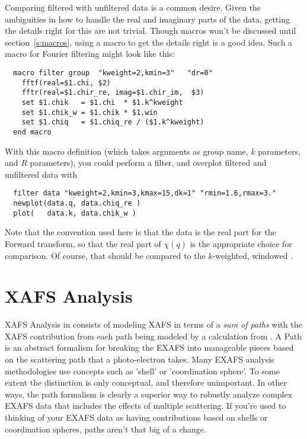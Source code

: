 \documentclass[11pt]{article}
\begin{document}
Comparing filtered with unfiltered data is a common desire. Given the
ambiguities in how to handle the real and imaginary parts of the data,
getting the details right for this are not trivial.  Though macros won't be
discussed until section~\ref{s:macros}, using a macro to get the details
right is a good idea.  Such a macro for Fourier filtering might look like
this:
{\small\begin{verbatim}
  macro filter group  "kweight=2,kmin=3"   "dr=0"
    fftf(real=$1.chi, $2)
    fftr(real=$1.chir_re, imag=$1.chir_im,  $3)
    set $1.chik   = $1.chi  * $1.k^kweight
    set $1.chik_w = $1.chik * $1.win
    set $1.chiq   = $1.chiq_re / ($1.k^kweight)
  end macro
\end{verbatim}}\noindent
With this macro definition (which takes arguments as group name, $k$
parameters, and $R$ parameters), you could perform a filter, and overplot
filtered and unfiltered data with
{\small\begin{verbatim}
  filter data "kweight=2,kmin=3,kmax=15,dk=1" "rmin=1.6,rmax=3."
  newplot(data.q, data.chiq_re )
  plot(   data.k, data.chik_w )
\end{verbatim}}\noindent
Note that the convention used here is that the data {\chik} is the real
part for the Forward transform, so that the real part of $\chi(q)$ is
the appropriate choice for comparison.  Of course, that should be
compared to the $k$-weighted, windowed {\chik}.


\clearpage
\section{XAFS Analysis}\label{s:xafs-anal}

XAFS Analysis in {\ifeffit} consists of modeling XAFS {\chik} in terms of a
{\emph{sum of paths}} with the XAFS contribution from each path being
modeled by a calculation from {\feff}.  A Path is an abstract formalism for
breaking the EXAFS into manageable pieces based on the scattering path that
a photo-electron takes.  Many EXAFS analysis methodologies use concepts
such as 'shell' or 'coordination sphere'.  To some extent the distinction
is only conceptual, and therefore unimportant.  In other ways, the path
formalism is clearly a superior way to robustly analyze complex EXAFS data
that includes the effects of multiple scattering.  If you're used
to thinking of your EXAFS data as having contributions based on shells or
coordination spheres, paths aren't that big of a change.
\end{document}
